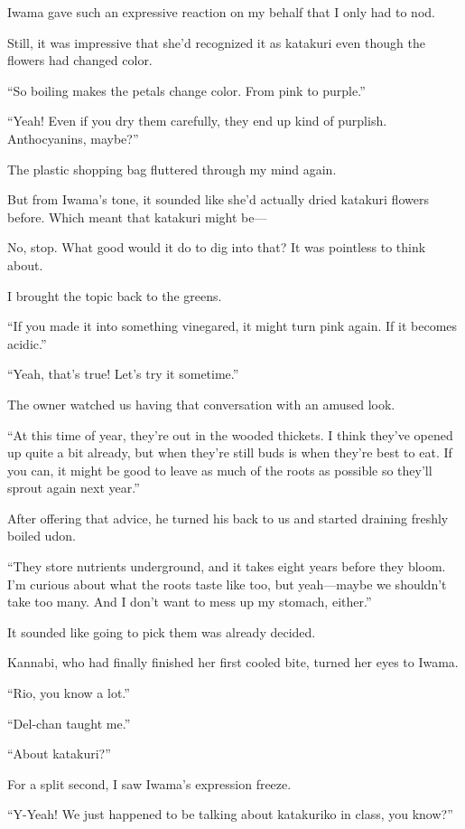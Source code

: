 \documentclass[
    a4paper,
    12pt,
    twoside,
    openany,
    UTF8,
    fontset=windows
]{ctexbook}
\begin{document}
Iwama gave such an expressive reaction on my behalf that I only had to nod.

Still, it was impressive that she'd recognized it as katakuri even though the flowers had changed color.

``So boiling makes the petals change color. From pink to purple.''

``Yeah! Even if you dry them carefully, they end up kind of purplish. Anthocyanins, maybe?''

The plastic shopping bag fluttered through my mind again.

But from Iwama's tone, it sounded like she'd actually dried katakuri flowers before. Which meant that katakuri might be---

No, stop. What good would it do to dig into that? It was pointless to think about.

I brought the topic back to the greens.

``If you made it into something vinegared, it might turn pink again. If it becomes acidic.''

``Yeah, that's true! Let's try it sometime.''

The owner watched us having that conversation with an amused look.

``At this time of year, they're out in the wooded thickets. I think they've opened up quite a bit already, but when they're still buds is when they're best to eat. If you can, it might be good to leave as much of the roots as possible so they'll sprout again next year.''

After offering that advice, he turned his back to us and started draining freshly boiled udon.

``They store nutrients underground, and it takes eight years before they bloom. I'm curious about what the roots taste like too, but yeah---maybe we shouldn't take too many. And I don't want to mess up my stomach, either.''

It sounded like going to pick them was already decided.

Kannabi, who had finally finished her first cooled bite, turned her eyes to Iwama.

``Rio, you know a lot.''

``Del-chan taught me.''

``About katakuri?''

For a split second, I saw Iwama's expression freeze.

``Y-Yeah! We just happened to be talking about katakuriko in class, you know?''
\end{document}
